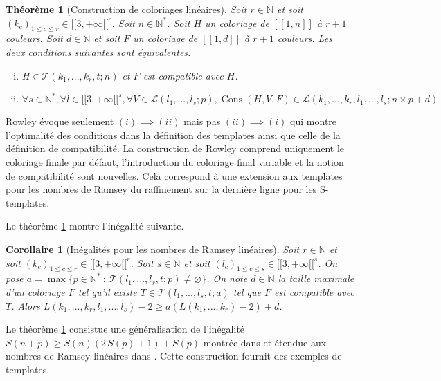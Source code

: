 \documentclass{article}
\newtheorem{theorem}[definition]{Théorème}
\newtheorem{corollary}[definition]{Corollaire}
\DeclareMathOperator{\cons}{Cons}
\begin{document}
\begin{theorem}[Construction de coloriages linéaires]
\label{thm:temp}
Soit \(r \in \mathbb{N}\) et soit \((k_c)_{1 \leqslant c \leqslant r} \in {[\![3, +\infty[\![}^r\). Soit \(n \in \mathbb{N}^*\). Soit \(H\) un coloriage de \([\![1,n]\!]\) à \(r + 1\) couleurs. Soit \(d \in \mathbb{N}\) et soit \(F\) un coloriage de \([\![1, d]\!]\) à \(r + 1\) couleurs. Les deux conditions suivantes sont équivalentes.

\begin{enumerate}[(i)]
\item \(H \in \mathcal{T}(k_1, ..., k_r, t; n)\) et \(F\) est compatible  avec \(H\).
\item \(\forall s \in \mathbb{N}^*, \forall l \in {[\![3, +\infty[\![}^s, \forall V \in \mathcal{L}(l_1, ..., l_s ; p), \cons(H, V, F) \in  \mathcal{L}(k_1, ..., k_r, l_1, ..., l_s ; n \times p + d)\)
\end{enumerate}
\end{theorem}

Rowley évoque seulement \((i) \implies (ii)\) mais pas \((ii) \implies (i)\) qui montre l'optimalité des conditions dans la définition des templates ainsi que celle de la définition de compatibilité.
La construction de Rowley comprend uniquement le coloriage finale par défaut, l'introduction du coloriage final variable et la notion de compatibilité sont nouvelles. Cela correspond à une extension aux templates pour les nombres de Ramsey du raffinement sur la dernière ligne pour les S-templates.

Le théorème \ref{thm:temp} montre l'inégalité suivante.

\begin{corollary}[Inégalités pour les nombres de Ramsey linéaires]
Soit \(r \in \mathbb{N}\) et soit \((k_c)_{1 \leqslant c \leqslant r} \in {[\![3, +\infty[\![}^r\). Soit \(s \in \mathbb{N}\) et soit \((l_c)_{1 \leqslant c \leqslant s} \in {[\![3, +\infty[\![}^s\). On pose \(a =\max \{p \in \mathbb{N}^* ~:~ \mathcal{T}(l_1, ..., l_s, t; p) \neq \varnothing\}\). On note \(d \in \mathbb{N}\) la taille maximale d'un coloriage \(F\) tel qu'il existe \(T \in \mathcal{T}(l_1, ..., l_s, t; a)\) tel que \(F\) est compatible avec \(T\). Alors \(L(k_1, ..., k_r, l_1, ..., l_s) - 2 \geqslant a (L(k_1, ..., k_r) - 2) + d\).
\end{corollary}

Le théorème \ref{thm:temp} consistue une généralisation de l'inégalité \(S(n + p) \geqslant S(n)  (2 \, S(p) + 1) + S(p)\) montrée dans \cite{AbbottHanson} et étendue aux nombres de Ramsey linéaires dans \cite{rowleyramseyabott}. Cette construction fournit des exemples de templates.
\end{document}
